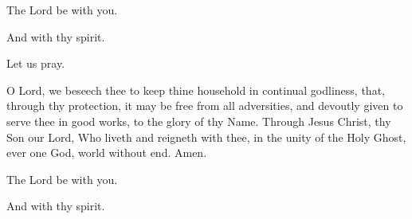 

\rubric{\Vbar}The Lord be with you.

\rubric{\Rbar}And with thy spirit.

Let us pray.

O Lord, we beseech thee to keep thine household in continual godliness, that, through thy protection, it may be free from all adversities, and devoutly given to serve thee in good works, to the glory of thy Name. Through Jesus Christ, thy Son our Lord, Who liveth and reigneth with thee, in the unity of the Holy Ghost, ever one God, world without end.\rubric{\Rbar} Amen.

\rubric{\Vbar}The Lord be with you.

\rubric{\Rbar}And with thy spirit.
